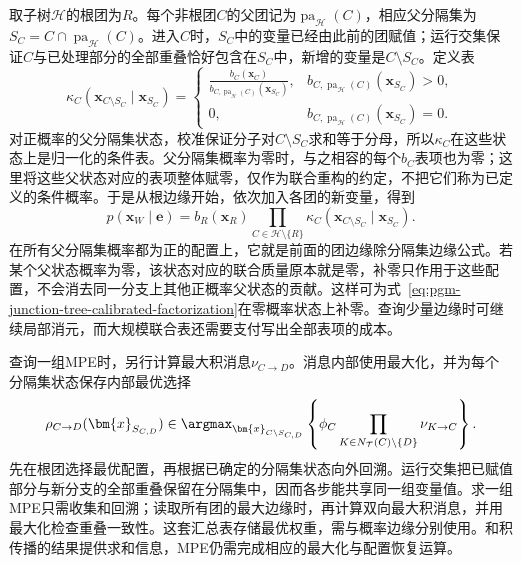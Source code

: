 取子树$\mathcal H$的根团为$R$。每个非根团$C$的父团记为$\operatorname{pa}_{\mathcal H}(C)$，相应父分隔集为$S_C=C\cap\operatorname{pa}_{\mathcal H}(C)$。进入$C$时，$S_C$中的变量已经由此前的团赋值；运行交集保证$C$与已处理部分的全部重叠恰好包含在$S_C$中，新增的变量是$C\setminus S_C$。定义表
\begin{equation}
  \kappa_C(\bm x_{C\setminus S_C}\mid\bm x_{S_C})
  =\begin{cases}
    \displaystyle\frac{b_C(\bm x_C)}
      {b_{C,\operatorname{pa}_{\mathcal H}(C)}(\bm x_{S_C})},
      &b_{C,\operatorname{pa}_{\mathcal H}(C)}(\bm x_{S_C})>0,\\[6pt]
    0,&b_{C,\operatorname{pa}_{\mathcal H}(C)}(\bm x_{S_C})=0.
  \end{cases}
  \label{eq:pgm-junction-tree-zero-separator-conditional}
\end{equation}
对正概率的父分隔集状态，校准保证分子对$C\setminus S_C$求和等于分母，所以$\kappa_C$在这些状态上是归一化的条件表。父分隔集概率为零时，与之相容的每个$b_C$表项也为零；这里将这些父状态对应的表项整体赋零，仅作为联合重构的约定，不把它们称为已定义的条件概率。于是从根边缘开始，依次加入各团的新变量，得到
\begin{equation}
  p(\bm x_W\mid\bm e)
    =b_R(\bm x_R)
      \prod_{C\in\mathcal H\setminus\{R\}}
        \kappa_C(\bm x_{C\setminus S_C}\mid\bm x_{S_C}).
  \label{eq:pgm-junction-tree-rooted-reconstruction}
\end{equation}
在所有父分隔集概率都为正的配置上，它就是前面的团边缘除分隔集边缘公式。若某个父状态概率为零，该状态对应的联合质量原本就是零，补零只作用于这些配置，不会消去同一分支上其他正概率父状态的贡献。这样可为式~\eqref{eq:pgm-junction-tree-calibrated-factorization}在零概率状态上补零。查询少量边缘时可继续局部消元，而大规模联合表还需要支付写出全部表项的成本。

查询一组MPE时，另行计算最大积消息$\nu_{C\to D}$。消息内部使用最大化，并为每个分隔集状态保存内部最优选择
\begin{equation}
  \rho_{C\to D}(\bm{x}_{S_{C,D}})
    \in\argmax_{\bm{x}_{C\setminus S_{C,D}}}
       \left\{\phi_C
          \prod_{K\in N_{\mathcal{T}}(C)\setminus\{D\}}\nu_{K\to C}\right\}.
  \label{eq:pgm-junction-tree-clique-backpointer}
\end{equation}
先在根团选择最优配置，再根据已确定的分隔集状态向外回溯。运行交集把已赋值部分与新分支的全部重叠保留在分隔集中，因而各步能共享同一组变量值。求一组MPE只需收集和回溯；读取所有团的最大边缘时，再计算双向最大积消息，并用最大化检查重叠一致性。这套汇总表存储最优权重，需与概率边缘分别使用。和积传播的结果提供求和信息，MPE仍需完成相应的最大化与配置恢复运算。

